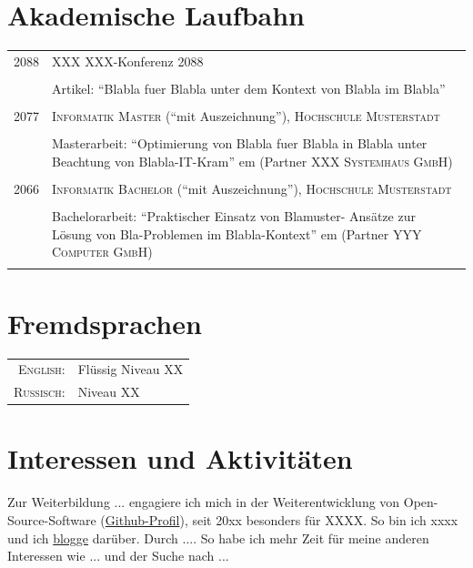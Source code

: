\documentclass[a4paper,10pt]{article}
\begin{document}
\section{Akademische Laufbahn}
\begin{tabular}{R{1.5cm}|p{12.0cm}}

 \textsc{2088} &  XXX XXX-Konferenz 2088\\&\emph{ }\\&\footnotesize{Artikel: \enquote{Blabla fuer Blabla unter dem Kontext von Blabla im Blabla}}\\ \\

 \textsc{2077} & \textsc{Informatik Master} (\enquote{mit Auszeichnung}), \textsc{Hochschule Musterstadt}\\&\emph{ }\\&\footnotesize{
 Masterarbeit: \enquote{Optimierung von Blabla fuer Blabla in Blabla unter Beachtung von Blabla-IT-Kram} em (Partner \textsc{XXX Systemhaus GmbH})
 }\\ \\

 \textsc{2066} & \textsc{Informatik Bachelor} (\enquote{mit Auszeichnung}), \textsc{Hochschule Musterstadt}\\&\emph{ }\\&\footnotesize{Bachelorarbeit: \enquote{Praktischer Einsatz von Blamuster- Ansätze zur Lösung von Bla-Problemen im Blabla-Kontext} em (Partner \textsc{YYY Computer GmbH})
 }\\ \\

\end{tabular}


\section{Fremdsprachen}
\begin{tabular}{rl}
\textsc{English:}&Flüssig Niveau XX\\
\textsc{Russisch:}&Niveau XX\\
\end{tabular}

\section{Interessen und Aktivitäten}
 Zur Weiterbildung ... engagiere ich mich in der Weiterentwicklung von Open-Source-Software (\href{https://github.com/meinprofil}{Github-Profil}), seit 20xx besonders für XXXX.
 So bin ich xxxx und ich \href{https://meinblog.wordpress.com}{blogge} darüber.
 Durch ....
 So habe ich mehr Zeit für meine anderen Interessen wie ... und der Suche nach ...

 
\end{document}
